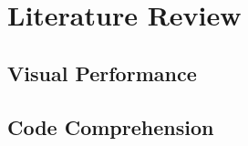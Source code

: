 
\chapter{Literature Review}
\label{cha:literaturereview}

\section{Visual Performance}
\label{sec:visualperformance}

\section{Code Comprehension}
\label{sec:codecomprehension}


